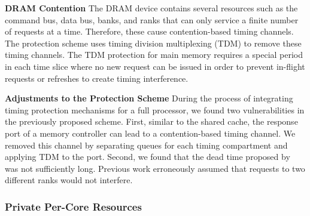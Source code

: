 \textbf{DRAM Contention}
The DRAM device contains several resources such as the command bus, data
bus, banks, and ranks that can only service a finite number of requests at a time. 
Therefore, these cause contention-based timing channels.
The protection scheme uses timing division multiplexing (TDM) to remove these
timing channels. The TDM protection for main memory requires a special period 
in each time slice where no new
request can be issued in order to prevent in-flight requests or refreshes to
create timing interference.


\textbf{Adjustments to the Protection Scheme}
During the process of integrating timing protection mechanisms for a full
processor, we found two vulnerabilities in the previously proposed scheme.
First, similar to the shared cache, the response port of a memory controller
can lead to a contention-based timing channel. We removed this channel by
separating queues for each timing compartment and applying TDM to the port.
Second, we found that the dead time proposed by ~\cite{ushpca14} was 
not sufficiently long. Previous work erroneously assumed that requests to two
different ranks would not interfere.

\subsubsection{Private Per-Core Resources}

